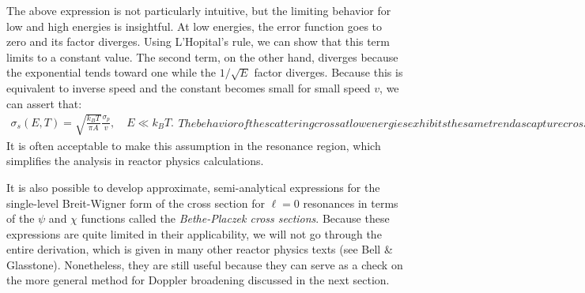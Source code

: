 The above expression is not particularly intuitive, but the limiting behavior for low and high energies is insightful. At low energies, the error function goes to zero and its factor diverges. Using L'Hopital's rule, we can show that this term limits to a constant value. The second term, on the other hand, diverges because the exponential tends toward one while the $1/\sqrt{E}$ factor diverges. Because this is equivalent to inverse speed and the constant becomes small for small speed $v$, we can assert that:
\begin{subequations}
\begin{align}
  \sigma_s(E,T) = \sqrt{ \frac{ k_B T }{ \pi A }  } \frac{\sigma_p}{v}, \quad E \ll k_B T.
\end{align}
The behavior of the scattering cross at low energies exhibits the same trend as capture cross sections.

At high energies, the both the error function term and its factor converges to one. The exponential term tends toward zero. Therefore, for high energies, we can state
\begin{align}
  \sigma_s(E,T) = \sigma_s(E) = \sigma_p, \quad E \gg k_B T .
\end{align}
\end{subequations}
It is often acceptable to make this assumption in the resonance region, which simplifies the analysis in reactor physics calculations.

It is also possible to develop approximate, semi-analytical expressions for the single-level Breit-Wigner form of the cross section for $\ell = 0$ resonances in terms of the $\psi$ and $\chi$ functions called the \emph{Bethe-Placzek cross sections}. Because these expressions are quite limited in their applicability, we will not go through the entire derivation, which is given in many other reactor physics texts (see Bell \& Glasstone). Nonetheless, they are still useful because they can serve as a check on the more general method for Doppler broadening discussed in the next section.

